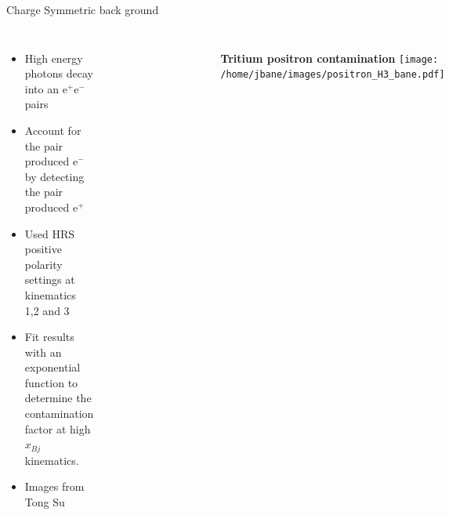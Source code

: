 \documentclass{beamer}
\begin{document}
\begin{frame}{Charge Symmetric back ground}
\begin{block}{}
	\begin{columns}
		\begin{itemize}
			\item High energy photons decay into an e$^+$e$^-$ pairs
			\item Account for the pair produced e$^-$ by detecting the pair produced e$^+$
			\item Used HRS positive polarity settings at kinematics 1,2 and 3
			\item Fit results with an exponential function to determine the contamination factor at high $x_{Bj}$ kinematics.
			\item Images from Tong Su
		\end{itemize}
		\begin{figure}
			
		\end{figure}
		\vspace{-12pt}
		\begin{figure}
			\textbf{Tritium positron contamination}
			\texttt{[image: /home/jbane/images/positron\_H3\_bane.pdf]}
		\end{figure}

	\end{columns}
	
\end{block}
\end{frame}
\end{document}
